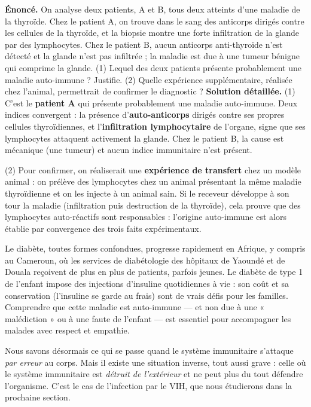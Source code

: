 \documentclass[11pt]{article}
\begin{document}
\begin{exoresolu}
\textbf{Énoncé.} On analyse deux patients, A et B, tous deux atteints d'une maladie de la thyroïde. Chez le patient A, on trouve dans le sang des anticorps dirigés contre les cellules de la thyroïde, et la biopsie montre une forte infiltration de la glande par des lymphocytes. Chez le patient B, aucun anticorps anti-thyroïde n'est détecté et la glande n'est pas infiltrée ; la maladie est due à une tumeur bénigne qui comprime la glande. (1) Lequel des deux patients présente probablement une maladie auto-immune ? Justifie. (2) Quelle expérience supplémentaire, réalisée chez l'animal, permettrait de confirmer le diagnostic ?
\tcblower
\textbf{Solution détaillée.}
(1) C'est le \textbf{patient A} qui présente probablement une maladie auto-immune. Deux indices convergent : la présence d'\textbf{auto-anticorps} dirigés contre ses propres cellules thyroïdiennes, et l'\textbf{infiltration lymphocytaire} de l'organe, signe que ses lymphocytes attaquent activement la glande. Chez le patient B, la cause est mécanique (une tumeur) et aucun indice immunitaire n'est présent.

(2) Pour confirmer, on réaliserait une \textbf{expérience de transfert} chez un modèle animal : on prélève des lymphocytes chez un animal présentant la même maladie thyroïdienne et on les injecte à un animal sain. Si le receveur développe à son tour la maladie (infiltration puis destruction de la thyroïde), cela prouve que des lymphocytes auto-réactifs sont responsables : l'origine auto-immune est alors établie par convergence des trois faits expérimentaux.
\end{exoresolu}

\begin{savaistu}[Et au Cameroun ?]
Le diabète, toutes formes confondues, progresse rapidement en Afrique, y compris au Cameroun, où les services de diabétologie des hôpitaux de Yaoundé et de Douala reçoivent de plus en plus de patients, parfois jeunes. Le diabète de type 1 de l'enfant impose des injections d'insuline quotidiennes à vie : son coût et sa conservation (l'insuline se garde au frais) sont de vrais défis pour les familles. Comprendre que cette maladie est auto-immune — et non due à une « malédiction » ou à une faute de l'enfant — est essentiel pour accompagner les malades avec respect et empathie.
\end{savaistu}

Nous savons désormais ce qui se passe quand le système immunitaire s'attaque \emph{par erreur} au corps. Mais il existe une situation inverse, tout aussi grave : celle où le système immunitaire est \emph{détruit de l'extérieur} et ne peut plus du tout défendre l'organisme. C'est le cas de l'infection par le VIH, que nous étudierons dans la prochaine section.
\end{document}
